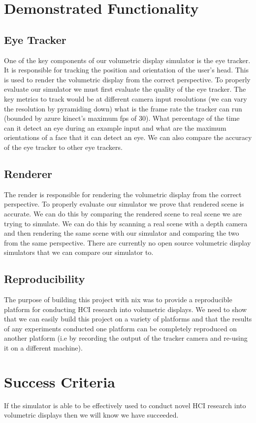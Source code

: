 \section{Demonstrated Functionality}
\subsection{Eye Tracker}
One of the key components of our volumetric display simulator is the eye tracker. It is responsible for tracking the position and orientation of the user's head. This is used to render the volumetric display from the correct perspective. To properly evaluate our simulator we must first evaluate the quality of the eye tracker. The key metrics to track would be at different camera input resolutions (we can vary the resolution by pyramiding down) what is the frame rate the tracker can run (bounded by azure kinect's maximum fps of 30). What percentage of the time can it detect an eye during an example input and what are the maximum orientations of a face that it can detect an eye. We can also compare the accuracy of the eye tracker to other eye trackers.

\subsection{Renderer}
The render is responsible for rendering the volumetric display from the correct perspective. To properly evaluate our simulator we prove that rendered scene is accurate. We can do this by comparing the rendered scene to real scene we are trying to simulate. We can do this by scanning a real scene with a depth camera and then rendering the same scene with our simulator and comparing the two from the same perspective. There are currently no open source volumetric display simulators that we can compare our simulator to.

\subsection{Reproducibility}
The purpose of building this project with nix was to provide a reproducible platform for conducting HCI research into volumetric displays. We need to show that we can easily build this project on a variety of platforms and that the results of any experiments conducted one platform can be completely reproduced on another platform (i.e by recording the output of the tracker camera and re-using it on a different machine). 

\section{Success Criteria}
If the simulator is able to be effectively used to conduct novel HCI research into volumetric displays then we will know we have succeeded. 


